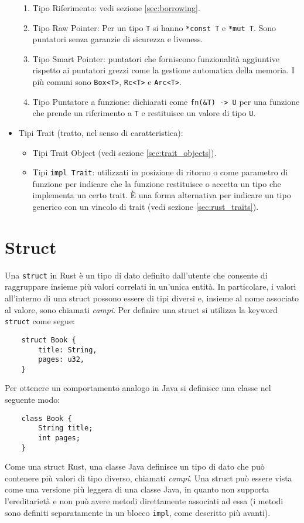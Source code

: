 \begin{itemize}
            \begin{enumerate}
                \item Tipo Riferimento: vedi sezione \ref{sec:borrowing}. 
                \item Tipo Raw Pointer: Per un tipo \texttt{T} si hanno \texttt{*const T} e \texttt{*mut T}. Sono puntatori senza garanzie di sicurezza e liveness.
                \item Tipo Smart Pointer: puntatori che forniscono funzionalità aggiuntive rispetto ai puntatori grezzi come la gestione automatica della memoria. I più comuni sono \texttt{Box<T>}, \texttt{Rc<T>} e \texttt{Arc<T>}. 
                \item Tipo Puntatore a funzione: dichiarati come \texttt{fn(\&T) -> U} per una funzione che prende un riferimento a \texttt{T} e restituisce un valore di tipo \texttt{U}.
            \end{enumerate}
        \item Tipi Trait (tratto, nel senso di caratteristica): 
        \begin{itemize}
            \item Tipi Trait Object (vedi sezione \ref{sec:trait_objects}).
            \item Tipi \texttt{impl Trait}: utilizzati in posizione di ritorno o come parametro di funzione per indicare che la funzione restituisce o accetta un tipo che implementa un certo trait. È una forma alternativa per indicare un tipo generico con un vincolo di trait (vedi sezione \ref{sec:rust_traits}).
        \end{itemize}
\end{itemize}
\section{Struct}
\label{sec:structs}
Una \texttt{struct} in Rust è un tipo di dato definito dall'utente che consente di raggruppare insieme più valori correlati in un'unica entità. In particolare, i valori all'interno di una struct possono essere di tipi diversi e, insieme al nome associato al valore, sono chiamati \textit{campi}. Per definire una struct si utilizza la keyword \texttt{struct} come segue:
\begin{verbatim}
    struct Book {
        title: String,
        pages: u32,
    }
\end{verbatim}
Per ottenere un comportamento analogo in Java si definisce una classe nel seguente modo:
\begin{verbatim}
    class Book {
        String title;
        int pages;
    }
\end{verbatim}
Come una struct Rust, una classe Java definisce un tipo di dato che può contenere più valori di tipo diverso, chiamati \textit{campi}. Una struct può essere vista come una versione più leggera di una classe Java, in quanto non supporta l'ereditarietà e non può avere metodi direttamente associati ad essa (i metodi sono definiti separatamente in un blocco \texttt{impl}, come descritto più avanti).

